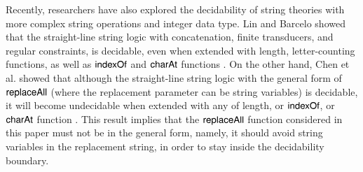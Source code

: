 Recently, researchers have also explored the decidability of string theories with more complex string operations and integer data type. Lin and Barcelo showed that the straight-line string logic with concatenation, finite transducers, and regular constraints, is decidable, even when extended with length, letter-counting functions, as well as $\mathsf{indexOf}$ and $\mathsf{charAt}$ functions \cite{LB16}.  
On the other hand, Chen et al. showed that although the straight-line string logic with the general form of $\mathsf{replaceAll}$ (where the replacement parameter can be string variables) is decidable, it will become undecidable when extended with any of length, or $\mathsf{indexOf}$, or $\mathsf{charAt}$ function \cite{CCH+18}. 
This result implies that the $\mathsf{replaceAll}$ function considered in this paper must not be in the general form, namely, it should avoid string variables in the replacement string, in order to stay inside the decidability boundary. 



